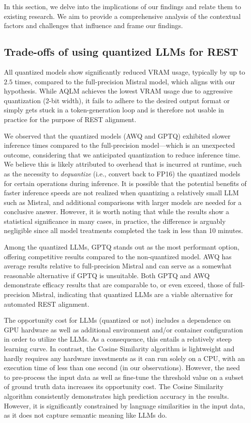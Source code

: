 \documentclass[conference]{IEEEtran}
\begin{document}
In this section, we delve into the implications of our findings and relate them to existing research. We aim to provide a comprehensive analysis of the contextual factors and challenges that influence and frame our findings. 

\subsection{Trade-offs of using quantized LLMs for REST}

All quantized models show significantly reduced VRAM usage, typically by up to $2.5$ times, compared to the full-precision Mistral model, which aligns with our hypothesis. While AQLM achieves the lowest VRAM usage due to aggressive quantization (2-bit width), it fails to adhere to the desired output format or simply gets stuck in a token-generation loop and is therefore not usable in practice for the purpose of REST alignment. 

We observed that the quantized models (AWQ and GPTQ) exhibited slower inference times compared to the full-precision model---which is an unexpected outcome, considering that we anticipated quantization to reduce inference time. We believe this is likely attributed to overhead that is incurred at runtime, such as the necessity to \textit{dequantize} (i.e., convert back to FP16) the quantized models for certain operations during inference. It is possible that the potential benefits of faster inference speeds are not realized when quantizing a relatively small LLM such as Mistral, and additional comparisons with larger models are needed for a conclusive answer. However, it is worth noting that while the results show a statistical significance in many cases, in practice, the difference is arguably negligible since all model treatments completed the task in less than 10 minutes. 

Among the quantized LLMs, GPTQ stands out as the most performant option, offering competitive results compared to the non-quantized model. AWQ has average results relative to full-precision Mistral and can serve as a somewhat reasonable alternative if GPTQ is unsuitable. Both GPTQ and AWQ demonstrate efficacy results that are comparable to, or even exceed, those of full-precision Mistral, indicating that quantized LLMs are a viable alternative for automated REST alignment.

The opportunity cost for LLMs (quantized or not) includes a dependence on GPU hardware as well as additional environment and/or container configuration in order to utilize the LLMs. As a consequence, this entails a relatively steep learning curve. In contrast, the Cosine Similarity algorithm is lightweight and hardly requires any hardware investments as it can run solely on a CPU, with an execution time of less than one second (in our observations). However, the need to pre-process the input data as well as fine-tune the threshold value on a subset of ground truth data increases its opportunity cost. The Cosine Similarity algorithm consistently demonstrates high prediction accuracy in the results. However, it is significantly constrained by language similarities in the input data, as it does not capture semantic meaning like LLMs do.
\end{document}
